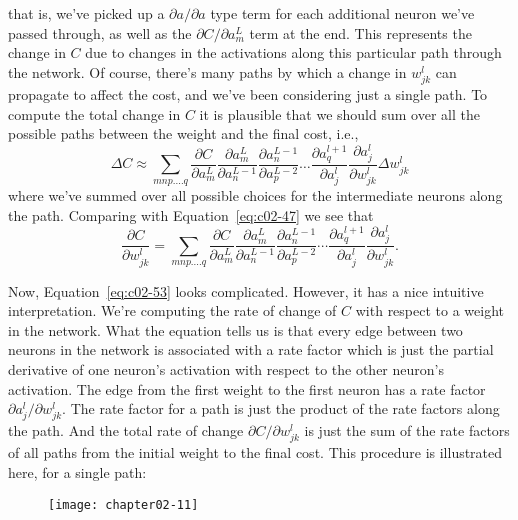 that is, we've picked up a $\partial a/\partial a$ type term for each additional neuron we've passed through, as well as the $\partial C / \partial a_{m}^{L}$ term at the end. This represents the change in $C$ due to changes in the activations along this particular path through the network. Of course, there's many paths by which a change in $w^l_{jk}$ can propagate to affect the cost, and we've been considering just a single path. To compute the total change in $C$ it is plausible that we should sum over all the possible paths between the weight and the final cost, i.e., 
\begin{equation}
\Delta C \approx \sum_{m n p . \ldots q} \frac{\partial C}{\partial a_{m}^{L}} \frac{\partial a_{m}^{L}}{\partial a_{n}^{L-1}} \frac{\partial a_{n}^{L-1}}{\partial a_{p}^{L-2}} \ldots \frac{\partial a_{q}^{l+1}}{\partial a_{j}^{l}} \frac{\partial a_{j}^{l}}{\partial w_{j k}^{l}} \Delta w_{j k}^{l}
\label{eq:c02-52}
\end{equation}
where we've summed over all possible choices for the intermediate neurons along the path. Comparing with Equation~\ref{eq:c02-47} we see that 
\begin{equation}
\frac{\partial C}{\partial w_{j k}^{l}}=\sum_{m n p . \ldots q} \frac{\partial C}{\partial a_{m}^{L}} \frac{\partial a_{m}^{L}}{\partial a_{n}^{L-1}} \frac{\partial a_{n}^{L-1}}{\partial a_{p}^{L-2}} \cdots \frac{\partial a_{q}^{l+1}}{\partial a_{j}^{l}} \frac{\partial a_{j}^{l}}{\partial w_{j k}^{l}}.
\label{eq:c02-53}
\end{equation}

Now, Equation~\ref{eq:c02-53} looks complicated. However, it has a nice intuitive interpretation. We're computing the rate of change of $C$ with respect to a weight in the network. What the equation tells us is that every edge between two neurons in the network is associated with a rate factor which is just the partial derivative of one neuron's activation with respect to the other neuron's activation. The edge from the first weight to the first neuron has a rate factor $\partial a_{j}^{l} / \partial w_{j k}^{l}$. The rate factor for a path is just the product of the rate factors along the path. And the total rate of change $\partial C / \partial w_{j k}^{l}$ is just the sum of the rate factors of all paths from the initial weight to the final cost. This procedure is illustrated here, for a single path: 

\begin{figure}
\texttt{[image: chapter02-11]}
\end{figure}

